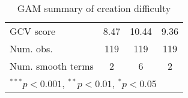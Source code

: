 \begin{table}
\begin{center}
\begin{tabular}{l c c c }
GCV score                 & 8.47         & 10.44        & 9.36       \\
Num. obs.                 & 119          & 119          & 119        \\
Num. smooth terms         & 2            & 6            & 2          \\
\hline
\multicolumn{4}{l}{\scriptsize{$^{***}p<0.001$, $^{**}p<0.01$, $^*p<0.05$}}
\end{tabular}
\caption{GAM summary of creation difficulty}
\label{table:coefficients}
\end{center}
\end{table}